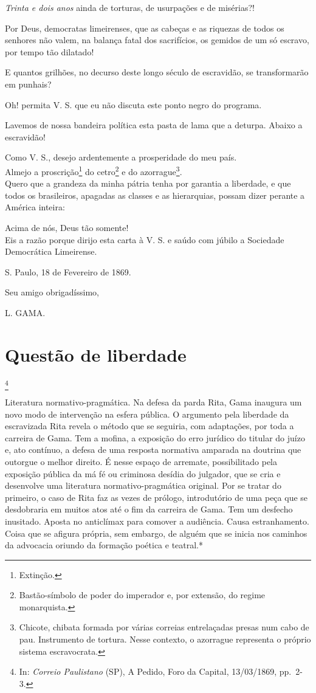 \emph{Trinta e dois anos} ainda de torturas, de usurpações e de
misérias?!

Por Deus, democratas limeirenses, que as cabeças e as riquezas de todos
os senhores não valem, na balança fatal dos sacrifícios, os gemidos de
um só escravo, por tempo tão dilatado!

E quantos grilhões, no decurso deste longo século de escravidão, se
transformarão em punhais?

Oh! permita V. S. que eu não discuta este ponto negro do programa.

Lavemos de nossa bandeira política esta pasta de lama que a deturpa.
Abaixo a escravidão!

\noindent\dotfill

Como V. S., desejo ardentemente a prosperidade do meu país.\\
Almejo a proscrição\footnote{Extinção.} do cetro\footnote{
  Bastão-símbolo de poder do imperador e, por extensão, do regime
  monarquista.} e do azorrague\footnote{Chicote, chibata formada por
  várias correias entrelaçadas presas num cabo de pau. Instrumento de
  tortura. Nesse contexto, o azorrague representa o próprio sistema
  escravocrata.}.\\
Quero que a grandeza da minha pátria tenha por garantia a liberdade, e
que todos os brasileiros, apagadas as classes e as hierarquias, possam
dizer perante a América inteira:

Acima de nós, Deus tão somente!\\
Eis a razão porque dirijo esta carta à V. S. e saúdo com júbilo a
Sociedade Democrática Limeirense.

S. Paulo, 18 de Fevereiro de 1869.

Seu amigo obrigadíssimo,

L. GAMA.

\chapter{Questão de liberdade}\footnote{In: \emph{Correio Paulistano} (SP),
  A Pedido, Foro da Capital, 13/03/1869, pp.~2-3.}

\begin{didascalia}
Literatura normativo-pragmática. Na defesa da parda Rita, Gama inaugura
um novo modo de intervenção na esfera pública. O argumento pela
liberdade da escravizada Rita revela o método que se seguiria, com
adaptações, por toda a carreira de Gama. Tem a mofina, a exposição do
erro jurídico do titular do juízo e, ato contínuo, a defesa de uma
resposta normativa amparada na doutrina que outorgue o melhor direito. É
nesse espaço de arremate, possibilitado pela exposição pública da má fé
ou criminosa desídia do julgador, que se cria e desenvolve uma
literatura normativo-pragmática original. Por se tratar do primeiro, o
caso de Rita faz as vezes de prólogo, introdutório de uma peça que se
desdobraria em muitos atos até o fim da carreira de Gama. Tem um
desfecho inusitado. Aposta no anticlímax para comover a audiência. Causa
estranhamento. Coisa que se afigura própria, sem embargo, de alguém que
se inicia nos caminhos da advocacia oriundo da formação poética e
teatral.*
\end{didascalia}

